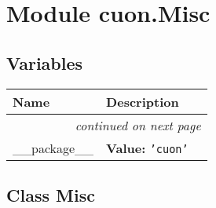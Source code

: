 %
%
%


\section{Module cuon.Misc}

    \label{cuon:Misc}


  \subsection{Variables}

    \vspace{-1cm}
\hspace{\varindent}\begin{longtable}{|p{\varnamewidth}|p{\vardescrwidth}|l}
\cline{1-2}
\cline{1-2} \centering \textbf{Name} & \centering \textbf{Description}& \\
\cline{1-2}
\endhead\cline{1-2}\multicolumn{3}{r}{\small\textit{continued on next page}}\\\endfoot\cline{1-2}
\endlastfoot\raggedright \_\-\_\-p\-a\-c\-k\-a\-g\-e\-\_\-\_\- & \raggedright \textbf{Value:} 
{\tt \texttt{'}\texttt{cuon}\texttt{'}}&\\
\cline{1-2}
\end{longtable}



\subsection{Class Misc}

